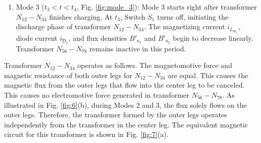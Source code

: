 \documentclass[lettersize,journal]{IEEEtran}
\begin{document}
\begin{enumerate}
    \item Mode 3 ($t_3 < t < t_4$, Fig. \ref{fig:mode_3}): Mode 3 starts right after transformer $N_{12}-N_{34}$ finishes charging. At $t_3$, Switch $S_1$ turns off, initiating the discharge phase of transformer $N_{12}-N_{34}$. The magnetizing current $i_{L_{\mathrm{m}_1}}$, diode current $i_{\mathrm{D}_1}$, and flux densities $B'_{\mathrm{o}_1}$ and $B'_{\mathrm{o}_2}$ begin to decrease linearly. Transformer $N_{56}-N_{78}$ remains inactive in this period.
\end{enumerate}
\vspace{\baselineskip}
Transformer $N_{12}-N_{34}$ operates as follows. The magnetomotive force and magnetic resistance of both outer legs for $N_{12}-N_{34}$ are equal. This causes the magnetic flux from the outer legs that flow into the center leg to be canceled. This causes no electromotive force generated in transformer $N_{56}-N_{78}$. As illustrated in Fig. \ref{fig:6}(b), during Modes 2 and 3, the flux solely flows on the outer legs. Therefore, the transformer formed by the outer legs operates independently from the transformer in the center leg. The equivalent magnetic circuit for this transformer is shown in Fig. \ref{fig:7}(a).
\vspace{\baselineskip}
\end{document}

